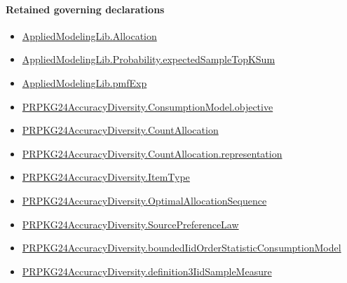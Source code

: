 \documentclass[10pt]{article}
\begin{document}
\paragraph{Retained governing declarations}
\begin{itemize}\raggedright
\item \hyperlink{governing-declaration-6972368b41f26c5a}{Applied\allowbreak{}Modeling\allowbreak{}Lib.\allowbreak{}Allocation}
\item \hyperlink{governing-declaration-ce2e2b3f3ae2c88d}{Applied\allowbreak{}Modeling\allowbreak{}Lib.\allowbreak{}Probability.\allowbreak{}expected\allowbreak{}Sample\allowbreak{}Top\allowbreak{}K\allowbreak{}Sum}
\item \hyperlink{governing-declaration-8e4b4389a4f6454b}{Applied\allowbreak{}Modeling\allowbreak{}Lib.\allowbreak{}pmf\allowbreak{}Exp}
\item \hyperlink{governing-declaration-3ab045ef5e79a864}{PRPKG24\allowbreak{}Accuracy\allowbreak{}Diversity.\allowbreak{}Consumption\allowbreak{}Model.\allowbreak{}objective}
\item \hyperlink{governing-declaration-4fbd8fa467bd5d78}{PRPKG24\allowbreak{}Accuracy\allowbreak{}Diversity.\allowbreak{}Count\allowbreak{}Allocation}
\item \hyperlink{paper-prerequisite-29fb13a9ce74aef5}{PRPKG24\allowbreak{}Accuracy\allowbreak{}Diversity.\allowbreak{}Count\allowbreak{}Allocation.\allowbreak{}representation}
\item \hyperlink{governing-declaration-562ef32e180a12be}{PRPKG24\allowbreak{}Accuracy\allowbreak{}Diversity.\allowbreak{}Item\allowbreak{}Type}
\item \hyperlink{governing-declaration-98821e74d0c4230b}{PRPKG24\allowbreak{}Accuracy\allowbreak{}Diversity.\allowbreak{}Optimal\allowbreak{}Allocation\allowbreak{}Sequence}
\item \hyperlink{governing-declaration-e662f313179ba80f}{PRPKG24\allowbreak{}Accuracy\allowbreak{}Diversity.\allowbreak{}Source\allowbreak{}Preference\allowbreak{}Law}
\item \hyperlink{governing-declaration-1b0c228a3621b96f}{PRPKG24\allowbreak{}Accuracy\allowbreak{}Diversity.\allowbreak{}bounded\allowbreak{}Iid\allowbreak{}Order\allowbreak{}Statistic\allowbreak{}Consumption\allowbreak{}Model}
\item \hyperlink{governing-declaration-267695cdd16a46ea}{PRPKG24\allowbreak{}Accuracy\allowbreak{}Diversity.\allowbreak{}definition3\allowbreak{}Iid\allowbreak{}Sample\allowbreak{}Measure}
\end{itemize}
\end{document}
